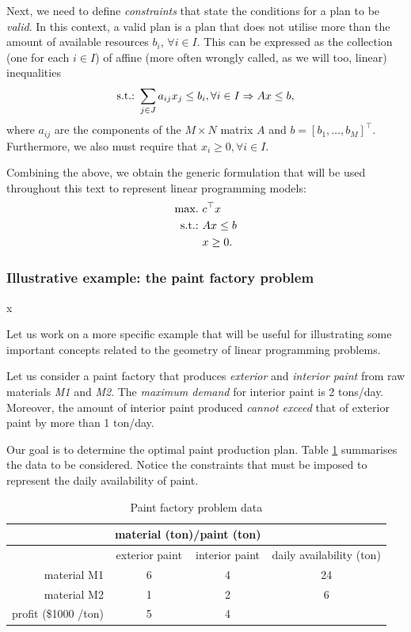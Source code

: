 Next, we need to define \emph{constraints} that state the conditions for a plan to be \emph{valid}. In this context, a valid plan is a plan that does not utilise more than the amount of available resources $b_i$, $\forall i \in I$. This can be expressed as the collection (one for each $i \in I$) of affine (more often wrongly called, as we will too, linear) inequalities
%
\begin{equation*}
	\mathop{\text{s.t.:~}} \sum_{j \in J} a_{ij}x_j \leq b_i, \forall i \in I	\Rightarrow	Ax \leq b,
\end{equation*}
%
where $a_{ij}$ are the components of the $M \times N$ matrix $A$ and $b = [b_1,\dots, b_M]^\top$. Furthermore, we also must require that $x_i \geq 0, \forall i \in I$.                                                                                                         

Combining the above, we obtain the generic formulation that will be used throughout this text to represent linear programming models:
%
\begin{align}
	\mathop{\text{max.~}} & c^\top x  \label{p1c1:eq:LP_objective} \\
	\mathop{\text{s.t.:~}}   & Ax \leq b \label{p1c1:eq:LP_constraint} \\
		  & x \geq 0. \label{p1c1:eq:LP_domain}
\end{align}
%


\subsubsection{Illustrative example: the paint factory problem \cite{taha2003operations}}x
 
Let us work on a more specific example that will be useful for illustrating some important concepts related to the geometry of linear programming problems.

Let us consider a paint factory that produces \emph{exterior} and \emph{interior paint} from raw materials \emph{M1} and \emph{M2}. The \emph{maximum demand} for interior paint is 2 tons/day. Moreover, the amount of interior paint produced \emph{cannot exceed} that of exterior paint by more than 1 ton/day. 

Our goal is to determine the optimal paint production plan. Table \ref{p1c1:tab:paint_factory_problem_data} summarises the data to be considered. Notice the constraints that must be imposed to represent the daily availability of paint.

\begin{table}[h]
	\begin{tabular}{rccc} \hline
	&\multicolumn{2}{c}{material (ton)/paint (ton)}\\ \hline
	& exterior paint & interior paint & daily availability (ton)\\ \hline
	material M1 & 6 & 4 & 24\\
	material M2 & 1 & 2 & 6\\ \hline
	profit (\$1000 /ton) & 5 & 4\\ \hline
	\end{tabular}
	\caption{Paint factory problem data} \label{p1c1:tab:paint_factory_problem_data}
\end{table}

